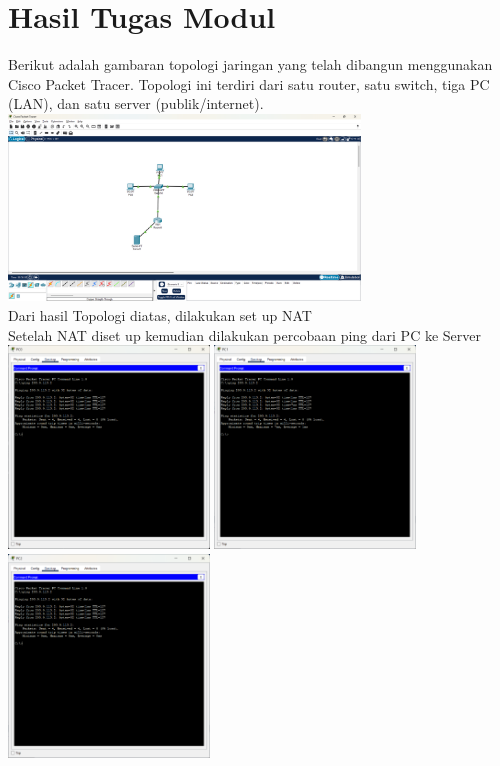 \section{Hasil Tugas Modul}
Berikut adalah gambaran topologi jaringan yang telah dibangun menggunakan Cisco Packet Tracer. Topologi ini terdiri dari satu router, satu switch, tiga PC (LAN), dan satu server (publik/internet).
\includegraphics[width=0.7\textwidth]{p4/img/topologi.png}\\
Dari hasil Topologi diatas, dilakukan set up NAT\\
Setelah NAT diset up kemudian dilakukan percobaan ping dari PC ke Server\\
\includegraphics[width=0.4\textwidth]{p4/img/tumod1.png}
\includegraphics[width=0.4\textwidth]{p4/img/tumod2.png}\\
\includegraphics[width=0.4\textwidth]{p4/img/tumod3.png}\\

